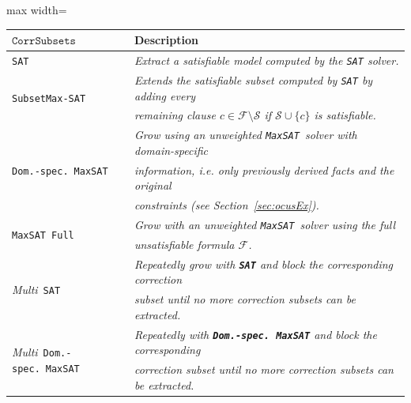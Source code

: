 \documentclass[twoside,11pt]{article}
\newcommand\m[1]{\mathcal{#1}}
\newcommand\formula{\ensuremath{\m{F} }\xspace}
\newcommand\mm[1]{\ensuremath{#1}\xspace}
\newcommand\call[1]{\mm{\texttt{#1}}}
\newcommand\sat{\texttt{{SAT}}\xspace}
\newcommand\subsetmaxsat{\texttt{SubsetMax-SAT}}
\newcommand\grow{\mm{\call{Grow}}}
\newcommand\corrsubsets{\mm{\call{CorrSubsets}}}
\newcommand\maxsat{\texttt{MaxSAT}}
\newcommand\domspecmaxsat{\texttt{Dom.-spec.}~\texttt{MaxSAT}}
\newcommand\maxsatfull{\texttt{MaxSAT Full}}
\begin{document}
\begin{table}[!h]
	\centering
	\begin{adjustbox}{max width=\textwidth}
		
		\begin{tabular}{|l|l|}
			\hline
			\textbf{\corrsubsets}  &  \textbf{Description}\\\hline
			
			\sat & \textit{Extract a satisfiable model computed by the \sat solver.} \\\hline
			\multirow{2}{*}{\subsetmaxsat} & \textit{Extends the satisfiable subset computed by \sat by adding every} \\
			&			\textit{remaining clause $c \in \formula \setminus \m{S}$ if $\m{S} \cup \{c\}$ is satisfiable.} \\\hline
			\multirow{3}{*}{\domspecmaxsat} & \textit{Grow using an unweighted \maxsat~solver with domain-specific }\\
			&  \textit{information, i.e. only previously derived facts and the original}\\
			&  \textit{constraints (see Section~\ref{sec:ocusEx}).}\\\hline
			\multirow{2}{*}{\maxsatfull} & \textit{Grow with an unweighted \maxsat~solver using the full } \\
			& \textit{unsatisfiable formula $\mathcal{F}$.} \\\hline
			\multirow{2}{*}{\emph{Multi}~\sat}& \textit{Repeatedly grow with \textbf{\sat}  and block the corresponding correction}\\ 
			& \textit{subset until no more correction subsets can be extracted.}\\\hline
			\multirow{2}{*}{\emph{Multi}~\domspecmaxsat}& \textit{Repeatedly with \textbf{\emph{\domspecmaxsat}} and block the corresponding}\\ 
			& \textit{correction subset until no more correction subsets can be extracted.}\\\hline
			

\end{tabular}
\end{adjustbox}
\end{table}
\end{document}
